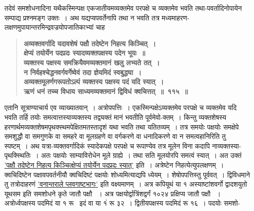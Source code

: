 \documentclass[11pt, openany]{book}
\begin{document}
\begin{sloppypar}
{\small तदेवं समशोधनादिना यथैकस्मिन्पक्ष एकजातीयमव्यक्तमेव परपक्षे च व्यक्तमेव भवति तथा-पवर्तादिनोपायेन सम्पाद्य प्रश्नमङ्ग उक्तः~। अथ यद्यप्यपवर्तेनापि तथा न भवति तत्र मध्यमाहरण-लक्षणमुपायान्तरमिन्द्रवज्रयोपजातिकाभ्यां चाह\textendash }

 \label{8.115}
\begin{quote}
{\large \textbf{{\color{purple}अव्यक्तवर्गादि यदावशेषं पक्षौ तदेष्टेन निहत्य किञ्चित्~।\\
क्षेप्यं तयोर्येन पदप्रदः स्यादव्यक्तपक्षस्य पदेन भूयः~॥\\
व्यक्तस्य पक्षस्य समक्रियैवमव्यक्तमानं खलु लभ्यते तत्~।\\
न निर्वहश्चेद्धनवर्गवर्गेष्वेवं तदा ज्ञेयमिदं स्वबुद्ध्या~।\\
अव्यक्तमूलर्णगरूपतोऽल्पं व्यक्तस्य पक्षस्य पदं यदि स्यात्~।\\
ऋणं धनं तच्च विधाय साध्यमव्यक्तमानं द्विविधं क्वचित्तत्~॥~११५~॥}}}
\end{quote}

एतानि सूत्राण्याचार्य एव व्याख्यातवान्~। अत्रोपपत्तिः~। एकस्मिन्पक्षेऽव्यक्तमेव परपक्षे च व्यक्तमेव यदि भवति तर्हि तयोः समत्वात्तस्याव्यक्तस्य तद्व्यक्तं मानं भवतीति पूर्वमेवो-क्तम्~। किन्तु व्यक्तशेषस्य हरणार्थमव्यक्तशेषमपृथक्स्थमपेक्षितमतस्तादृशं यथा भवति तथा यतितव्यम्~। तत्र समयोः पक्षयोः समक्षेपे समशुद्धौ वा समगुणके वा समहरे वा मूलग्रहणे वा वर्गकरणे वा धनादिकरणे वा न समत्वहानिरिति तु स्पष्टम्~। अथ यत्रा-व्यक्तवर्गादिकं स्यादेकपक्षे परपक्षे च रूपाण्येव तत्र मूलेन विना कदापि नाव्यक्तस्या-पृथक्स्थितिः~। अतः पक्षयोः साम्याविरोधेन मूले ग्राह्ये~। तथा सति मूलयोरपि समत्वं स्यात्~। अत उक्तं \hyperref[8.115]{'पक्षौ तदेष्टेन निहत्य किञ्चित्क्षेप्यं तयोर्येन पदप्रदः स्यात्'} इति~। अत्रेष्टेन निहत्येत्युपलक्षणम्~। क्वचिदिष्टेन पक्षावपवर्तनीयौ क्वचिदिष्टं पक्षयोः शोध्यमित्याद्यपि ध्येयम्~। शेषोपपत्तिस्तु पूर्ववत्~। द्विविधमाने तु तत्रोदाहरणं \hyperref[8.124]{'वनान्तराले प्लवगाष्टभागः'} इति वक्ष्यमाणम्~। अत्र कपियूथं या १ अस्याष्टांशवर्गो द्वादशयुतो यूथसम इति समशोधने कृते जातौ पक्षौ ~। अत्र पक्षयोर्द्वात्रिंशद्वर्गं १०२४ प्रक्षिप्य जातौ पक्षौ ~। अत्रोर्ध्वपक्षस्य पदमिदं या १ रू \, इदं वा या १ं रू ३२~। द्वितीयपक्षस्य पदमिदं रू १६~। पदयोः समशो-
\end{sloppypar}
\end{document}
